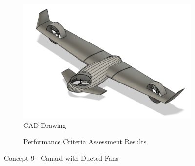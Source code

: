 \begin{figure}[H]
\centering
\begin{subfigure}[t]{.5\textwidth}
  \centering
  \includegraphics[width=0.95\linewidth]{Concepts/CAD/Round3_1.png}
  \vspace{0.125cm}
  \caption{CAD Drawing}
  \label{fig:cad9}
\end{subfigure}%
\begin{subfigure}[t]{.5\textwidth}
  \centering
  \caption{Performance Criteria Assessment Results}
  \label{fig:radar9}
\end{subfigure}
\caption{Concept 9 - Canard with Ducted Fans}
\label{fig:concept9}
\end{figure}



